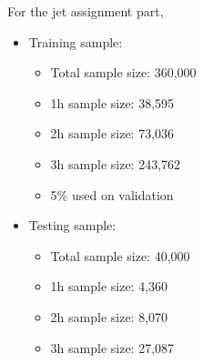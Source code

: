 \documentclass[12pt]{article}
\begin{document}
    For the jet assignment part,
    \begin{itemize}
        \item Training sample:
        \begin{itemize}
            \item Total sample size: 360,000
            \item 1h sample size: 38,595
            \item 2h sample size: 73,036
            \item 3h sample size: 243,762
            \item 5\% used on validation
        \end{itemize}
        \item Testing sample:
        \begin{itemize}
            \item Total sample size: 40,000
            \item 1h sample size: 4,360
            \item 2h sample size: 8,070
            \item 3h sample size: 27,087
        \end{itemize}
    \end{itemize}
\end{document}
